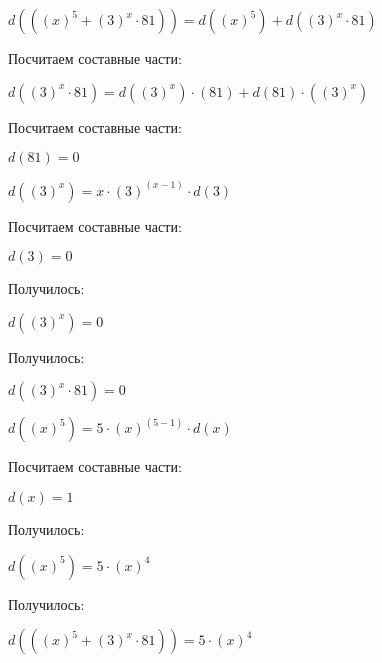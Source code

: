 $ d(((x)^5+(3)^x \cdot 81)) = d((x)^5) + d((3)^x \cdot 81)$

Посчитаем составные части:

$ d((3)^x \cdot 81) = d((3)^x) \cdot (81) + d(81) \cdot ((3)^x)$

Посчитаем составные части:

$ d(81) = 0$

$ d((3)^x) = x \cdot (3)^(x - 1) \cdot d(3)$

Посчитаем составные части:

$ d(3) = 0$

Получилось:

$ d((3)^x) = 0$

Получилось:

$ d((3)^x \cdot 81) = 0$

$ d((x)^5) = 5 \cdot (x)^(5 - 1) \cdot d(x)$

Посчитаем составные части:

$ d(x) = 1$

Получилось:

$ d((x)^5) = 5 \cdot (x)^4$

Получилось:

$ d(((x)^5+(3)^x \cdot 81)) = 5 \cdot (x)^4$

